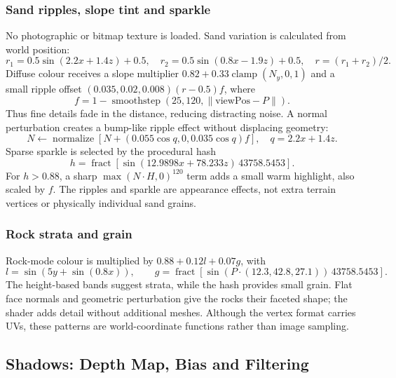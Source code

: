 \subsubsection{Sand ripples, slope tint and sparkle}
No photographic or bitmap texture is loaded. Sand variation is calculated from world position:
\begin{equation}
r_1=0.5\sin(2.2x+1.4z)+0.5,\quad
r_2=0.5\sin(0.8x-1.9z)+0.5,\quad r=(r_1+r_2)/2.
\end{equation}
Diffuse colour receives a slope multiplier $0.82+0.33\operatorname{clamp}(N_y,0,1)$ and a small ripple offset $(0.035,0.02,0.008)(r-0.5)f$, where
\begin{equation}
f=1-\operatorname{smoothstep}(25,120,\|\mathrm{viewPos}-P\|).
\end{equation}
Thus fine details fade in the distance, reducing distracting noise. A normal perturbation creates a bump-like ripple effect without displacing geometry:
\begin{equation}
N\leftarrow\operatorname{normalize}\left[N+(0.055\cos q,0,0.035\cos q)f\right],\quad q=2.2x+1.4z.
\end{equation}
Sparse sparkle is selected by the procedural hash
\begin{equation}
h=\operatorname{fract}[\sin(12.9898x+78.233z)\,43758.5453].
\end{equation}
For $h>0.88$, a sharp $\max(N\cdot H,0)^{120}$ term adds a small warm highlight, also scaled by $f$. The ripples and sparkle are appearance effects, not extra terrain vertices or physically individual sand grains.

\subsubsection{Rock strata and grain}
Rock-mode colour is multiplied by $0.88+0.12l+0.07g$, with
\begin{equation}
l=\sin(5y+\sin(0.8x)),\qquad
g=\operatorname{fract}[\sin(P\cdot(12.3,42.8,27.1))\,43758.5453].
\end{equation}
The height-based bands suggest strata, while the hash provides small grain. Flat face normals and geometric perturbation give the rocks their faceted shape; the shader adds detail without additional meshes. Although the vertex format carries UVs, these patterns are world-coordinate functions rather than image sampling.

\subsection{Shadows: Depth Map, Bias and Filtering}

